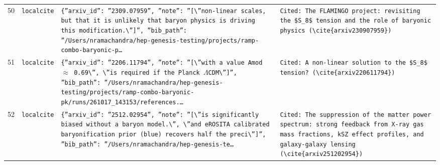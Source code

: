 \documentclass[11pt,a4paper]{article}
\begin{document}
\begin{longtable}{@{}p{}p{}p{}p{}@{}}
50 & \texttt{local}\newline\texttt{cite} & \texttt{\{''arxiv\_\allowbreak{}id'':\allowbreak{} ''2309.07959'',\allowbreak{} ''note'':\allowbreak{} ''[\textbackslash{}\allowbreak{}''non-linear scales,\allowbreak{} but that it is unlikely that baryon physics is driving this modification.\textbackslash{}\allowbreak{}'']\allowbreak{}'',\allowbreak{} ''bib\_\allowbreak{}path'':\allowbreak{} ''/\allowbreak{}Users/\allowbreak{}nramachandra/\allowbreak{}hep-genesis-testing/\allowbreak{}projects/\allowbreak{}ramp-combo-baryonic-p\ldots{}\allowbreak{}} & \texttt{Cited:\allowbreak{} The FLAMINGO project:\allowbreak{} revisiting the \$S\_\allowbreak{}8\$ tension and the role of baryonic physics (\textbackslash{}\allowbreak{}cite\{arxiv230907959\}\allowbreak{})\allowbreak{}} \\
51 & \texttt{local}\newline\texttt{cite} & \texttt{\{''arxiv\_\allowbreak{}id'':\allowbreak{} ''2206.11794'',\allowbreak{} ''note'':\allowbreak{} ''[\textbackslash{}\allowbreak{}''with a value Amod $\approx$ 0.69\textbackslash{}\allowbreak{}'',\allowbreak{} \textbackslash{}\allowbreak{}''is required if the Planck $\Lambda$CDM\textbackslash{}\allowbreak{}'']\allowbreak{}'',\allowbreak{} ''bib\_\allowbreak{}path'':\allowbreak{} ''/\allowbreak{}Users/\allowbreak{}nramachandra/\allowbreak{}hep-genesis-testing/\allowbreak{}projects/\allowbreak{}ramp-combo-baryonic-pk/\allowbreak{}runs/\allowbreak{}261017\_\allowbreak{}143153/\allowbreak{}references.\ldots{}\allowbreak{}} & \texttt{Cited:\allowbreak{} A non-linear solution to the \$S\_\allowbreak{}8\$ tension? (\textbackslash{}\allowbreak{}cite\{arxiv220611794\}\allowbreak{})\allowbreak{}} \\
52 & \texttt{local}\newline\texttt{cite} & \texttt{\{''arxiv\_\allowbreak{}id'':\allowbreak{} ''2512.02954'',\allowbreak{} ''note'':\allowbreak{} ''[\textbackslash{}\allowbreak{}''is significantly biased without a baryon model.\textbackslash{}\allowbreak{}'',\allowbreak{} \textbackslash{}\allowbreak{}''and eROSITA calibrated baryonification prior (blue)\allowbreak{} recovers half the preci\textbackslash{}\allowbreak{}'']\allowbreak{}'',\allowbreak{} ''bib\_\allowbreak{}path'':\allowbreak{} ''/\allowbreak{}Users/\allowbreak{}nramachandra/\allowbreak{}hep-genesis-te\ldots{}\allowbreak{}} & \texttt{Cited:\allowbreak{} The suppression of the matter power spectrum:\allowbreak{} strong feedback from X-ray gas mass fractions,\allowbreak{} kSZ effect profiles,\allowbreak{} and galaxy-galaxy lensing (\textbackslash{}\allowbreak{}cite\{arxiv251202954\}\allowbreak{})\allowbreak{}} \\

\end{longtable}
\end{document}
